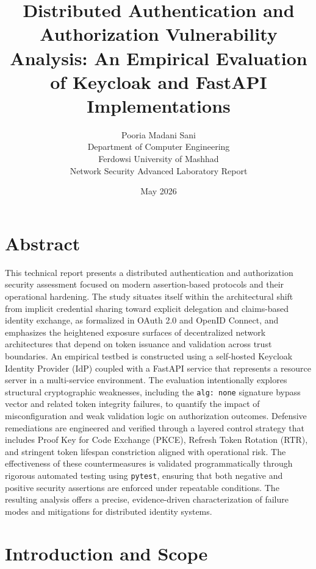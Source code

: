 \documentclass[11pt,a4paper]{report}
\title{Distributed Authentication and Authorization Vulnerability Analysis: An Empirical Evaluation of Keycloak and FastAPI Implementations}
\author{Pooria Madani Sani\\Department of Computer Engineering\\Ferdowsi University of Mashhad\\Network Security Advanced Laboratory Report}
\date{May 2026}
\begin{document}
\hypersetup{pageanchor=false}
\maketitle
\hypersetup{pageanchor=true}

\chapter*{Abstract}
This technical report presents a distributed authentication and authorization security assessment focused on modern assertion-based protocols and their operational hardening. The study situates itself within the architectural shift from implicit credential sharing toward explicit delegation and claims-based identity exchange, as formalized in OAuth 2.0 and OpenID Connect, and emphasizes the heightened exposure surfaces of decentralized network architectures that depend on token issuance and validation across trust boundaries. An empirical testbed is constructed using a self-hosted Keycloak Identity Provider (IdP) coupled with a FastAPI service that represents a resource server in a multi-service environment. The evaluation intentionally explores structural cryptographic weaknesses, including the \texttt{alg: none} signature bypass vector and related token integrity failures, to quantify the impact of misconfiguration and weak validation logic on authorization outcomes. Defensive remediations are engineered and verified through a layered control strategy that includes Proof Key for Code Exchange (PKCE), Refresh Token Rotation (RTR), and stringent token lifespan constriction aligned with operational risk. The effectiveness of these countermeasures is validated programmatically through rigorous automated testing using \texttt{pytest}, ensuring that both negative and positive security assertions are enforced under repeatable conditions. The resulting analysis offers a precise, evidence-driven characterization of failure modes and mitigations for distributed identity systems.

\tableofcontents
\clearpage

\hypersetup{pageanchor=false}
\hypersetup{pageanchor=true}

\chapter{Introduction and Scope}
\label{chap:intro}
\end{document}
